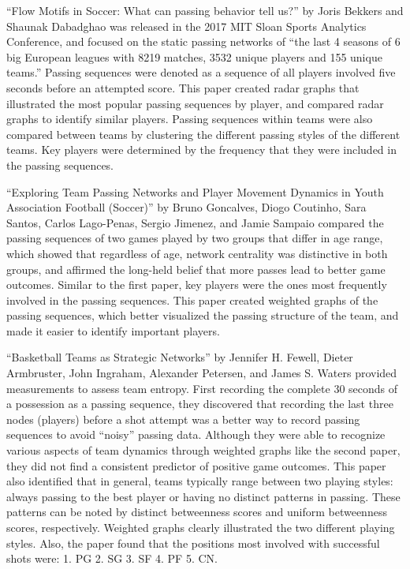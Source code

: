 \documentclass[12pt,twoside]{dukestatscithesis}
\theoremstyle{definition}
\theoremstyle{definition}
\theoremstyle{definition}
\theoremstyle{remark}
\begin{document}
``Flow Motifs in Soccer: What can passing behavior tell us?'' by Joris
Bekkers and Shaunak Dabadghao was released in the 2017 MIT Sloan Sports
Analytics Conference, and focused on the static passing networks of
``the last 4 seasons of 6 big European leagues with 8219 matches, 3532
unique players and 155 unique teams.'' Passing sequences were denoted as
a sequence of all players involved five seconds before an attempted
score. This paper created radar graphs that illustrated the most popular
passing sequences by player, and compared radar graphs to identify
similar players. Passing sequences within teams were also compared
between teams by clustering the different passing styles of the
different teams. Key players were determined by the frequency that they
were included in the passing sequences.

``Exploring Team Passing Networks and Player Movement Dynamics in Youth
Association Football (Soccer)'' by Bruno Goncalves, Diogo Coutinho, Sara
Santos, Carlos Lago-Penas, Sergio Jimenez, and Jamie Sampaio compared
the passing sequences of two games played by two groups that differ in
age range, which showed that regardless of age, network centrality was
distinctive in both groups, and affirmed the long-held belief that more
passes lead to better game outcomes. Similar to the first paper, key
players were the ones most frequently involved in the passing sequences.
This paper created weighted graphs of the passing sequences, which
better visualized the passing structure of the team, and made it easier
to identify important players.

``Basketball Teams as Strategic Networks'' by Jennifer H. Fewell, Dieter
Armbruster, John Ingraham, Alexander Petersen, and James S. Waters
provided measurements to assess team entropy. First recording the
complete 30 seconds of a possession as a passing sequence, they
discovered that recording the last three nodes (players) before a shot
attempt was a better way to record passing sequences to avoid ``noisy''
passing data. Although they were able to recognize various aspects of
team dynamics through weighted graphs like the second paper, they did
not find a consistent predictor of positive game outcomes. This paper
also identified that in general, teams typically range between two
playing styles: always passing to the best player or having no distinct
patterns in passing. These patterns can be noted by distinct betweenness
scores and uniform betweenness scores, respectively. Weighted graphs
clearly illustrated the two different playing styles. Also, the paper
found that the positions most involved with successful shots were: 1. PG
2. SG 3. SF 4. PF 5. CN.
\end{document}
